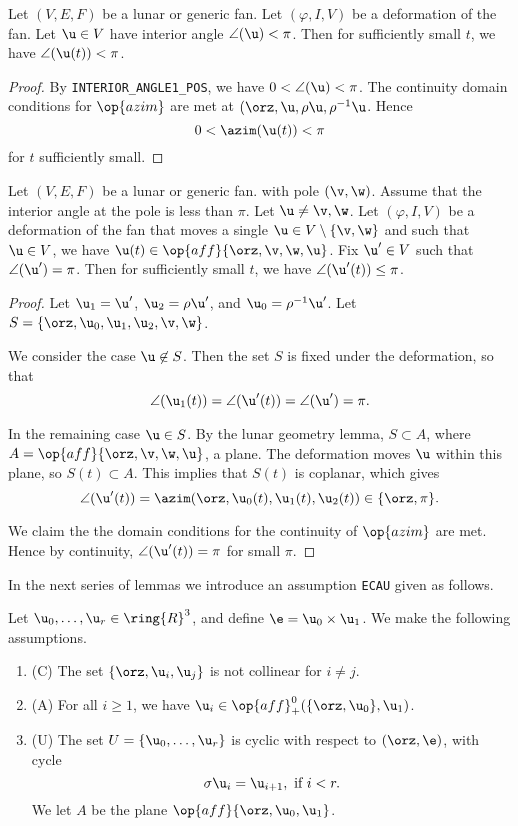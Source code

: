 \begin{lemma}[]
  Let $(V,E,F)$ be a lunar or generic fan.
Let $(\varphi,I,V)$ be a deformation of the fan.
Let $\u\in V$ have interior angle $\angle(\u)<\pi$.  Then for sufficiently small $t$, we have
$\angle(\u(t))<\pi$.
\end{lemma}

\begin{proof}
By {\tt INTERIOR\_ANGLE1\_POS}, we have $0 < \angle(\u) <\pi$.  The continuity domain conditions for $\op{azim}$
are met at $(\orz,\u,\rho\u,\rho^{-1}\u$.   Hence
\[
0 < \azim(\u(t)) < \pi
\]
for $t$ sufficiently small.
\end{proof}

\begin{lemma}[]
  Let $(V,E,F)$ be a lunar or generic fan.
 with pole $(\v,\w)$.  Assume that the interior angle at the pole
is less than $\pi$.  Let $\u\ne \v,\w$.  
Let $(\varphi,I,V)$ be a deformation of the fan that moves a single $\u\in V\setminus\{\v,\w\}$ and
 such that  $\u\in V$, we have $\u(t)\in \op{aff}\{\orz,\v,\w,\u\}$.
Fix $\u'\in V$ such that $\angle(\u')=\pi$.  Then for sufficiently small $t$, we have
$\angle(\u'(t))\le\pi$.
\end{lemma}

\begin{proof}  Let $\u_1=\u'$, $\u_2=\rho\u'$, and $\u_0 = \rho^{-1}\u'$.  
Let $S=\{\orz,\u_0,\u_1,\u_2,\v,\w\}$.

We consider the case $\u\not\in S$.  
Then the set $S$ is fixed under the deformation, so
that 
\[
\angle(\u_1(t)) = \angle(\u'(t)) =\angle(\u') =\pi.
\]

In the remaining case $\u\in S$.  
By the lunar geometry
lemma, $S \subset A$, where $A = \op{aff}\{\orz,\v,\w,\u\}$, a plane.
The deformation moves $\u$ within this plane, so $S(t)\subset A$.  This implies that $S(t)$ is coplanar,
which gives 
\[
\angle(\u'(t))=\azim(\orz,\u_0(t),\u_1(t),\u_2(t))\in \{\orz,\pi\}.
\]

We claim the the domain conditions for the continuity of $\op{azim}$ are met.  Hence
by continuity, $\angle(\u'(t))=\pi$ for small $\pi$.
\end{proof}

In the next series of lemmas we introduce an assumption {\tt ECAU} given as follows.

\begin{remark}[ECAU]
Let $\u_0,\ldots,\u_r\in\ring{R}^3$, and define $\e = \u_0\times\u_1$.  We make
the following assumptions.
\begin{enumerate}
\item (C) The set $\{\orz,\u_i,\u_j\}$ is not collinear for $i\ne j$.
\item (A) For all $i\ge 1$, we have $\u_i\in \op{aff}_+^0(\{\orz,\u_0\},\u_1)$.
\item (U) The set $U = \{\u_0,\ldots,\u_r\}$ is cyclic with respect to $(\orz,\e)$, with cycle
\[
\sigma \u_i = \u_{i+1},\text { if } i< r.
\]
We let $A$ be the plane $\op{aff}\{\orz,\u_0,\u_1\}$.
\end{enumerate}
\end{remark}


